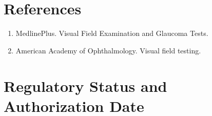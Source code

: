 \section*{References}
\begin{enumerate}
  \item MedlinePlus. Visual Field Examination and Glaucoma Tests.
  \item American Academy of Ophthalmology. Visual field testing.
\end{enumerate}

\clearpage


\section*{Regulatory Status and Authorization Date}

\clearpage
